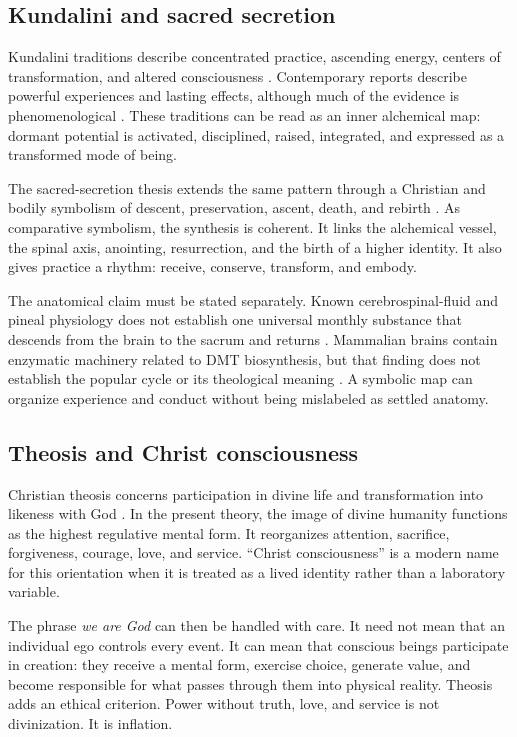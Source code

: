 \documentclass[11pt]{article}
\theoremstyle{plain}
\theoremstyle{definition}
\begin{document}
\subsection*{Kundalini and sacred secretion}

Kundalini traditions describe concentrated practice, ascending energy, centers of
transformation, and altered consciousness
\citep{buhnemann2011kundalini,white1996alchemicalbody}. Contemporary reports describe
powerful experiences and lasting effects, although much of the evidence is
phenomenological \citep{woollacott2021kundalini}. These traditions can be read as an
inner alchemical map: dormant potential is activated, disciplined, raised, integrated,
and expressed as a transformed mode of being.

The sacred-secretion thesis extends the same pattern through a Christian and bodily
symbolism of descent, preservation, ascent, death, and rebirth
\citep{edgar2026humandivinity}. As comparative symbolism, the synthesis is coherent.
It links the alchemical vessel, the spinal axis, anointing, resurrection, and the birth
of a higher identity. It also gives practice a rhythm: receive, conserve, transform,
and embody.

The anatomical claim must be stated separately. Known cerebrospinal-fluid and pineal
physiology does not establish one universal monthly substance that descends from the
brain to the sacrum and returns \citep{hladky2014csf,nichols2018pineal}. Mammalian
brains contain enzymatic machinery related to DMT biosynthesis, but that finding does
not establish the popular cycle or its theological meaning \citep{dean2019dmt}. A
symbolic map can organize experience and conduct without being mislabeled as settled
anatomy.

\subsection*{Theosis and Christ consciousness}

Christian theosis concerns participation in divine life and transformation into
likeness with God \citep{athanasius2011incarnation,papanikolaou2020theosis}. In the
present theory, the image of divine humanity functions as the highest regulative mental
form. It reorganizes attention, sacrifice, forgiveness, courage, love, and service.
``Christ consciousness'' is a modern name for this orientation when it is treated as
a lived identity rather than a laboratory variable.

The phrase \emph{we are God} can then be handled with care. It need not mean that an
individual ego controls every event. It can mean that conscious beings participate in
creation: they receive a mental form, exercise choice, generate value, and become
responsible for what passes through them into physical reality. Theosis adds an ethical
criterion. Power without truth, love, and service is not divinization. It is inflation.
\end{document}
